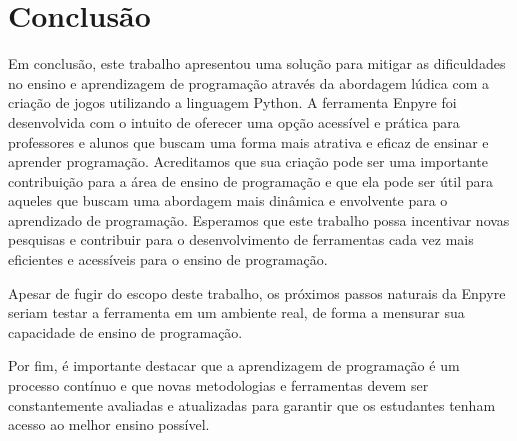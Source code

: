 \chapter[Conclusão]{Conclusão}

Em conclusão, este trabalho apresentou uma solução para mitigar as dificuldades no ensino e aprendizagem de programação através da abordagem lúdica com a criação de jogos utilizando a linguagem Python. A ferramenta Enpyre foi desenvolvida com o intuito de oferecer uma opção acessível e prática para professores e alunos que buscam uma forma mais atrativa e eficaz de ensinar e aprender programação. Acreditamos que sua criação pode ser uma importante contribuição para a área de ensino de programação e que ela pode ser útil para aqueles que buscam uma abordagem mais dinâmica e envolvente para o aprendizado de programação. Esperamos que este trabalho possa incentivar novas pesquisas e contribuir para o desenvolvimento de ferramentas cada vez mais eficientes e acessíveis para o ensino de programação.

Apesar de fugir do escopo deste trabalho, os próximos passos naturais da Enpyre seriam testar a ferramenta em um ambiente real, de forma a mensurar sua capacidade de ensino de programação.

Por fim, é importante destacar que a aprendizagem de programação é um processo contínuo e que novas metodologias e ferramentas devem ser constantemente avaliadas e atualizadas para garantir que os estudantes tenham acesso ao melhor ensino possível.

